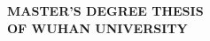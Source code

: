 



\thispagestyle{empty}
\renewcommand{\baselinestretch}{1.5}  %
\vspace*{0.5cm}

\begin{center}
  { \textbf{MASTER'S DEGREE THESIS \\ OF WUHAN UNIVERSITY} \par}
\end{center}

\begin{center}{  \par}\end{center}
\begin{center}{  \par}\end{center}
\begin{center}{  \par}\end{center}
\begin{center}{  \par}\end{center}

\begin{center}{ \the\Etitle \par}\end{center}


